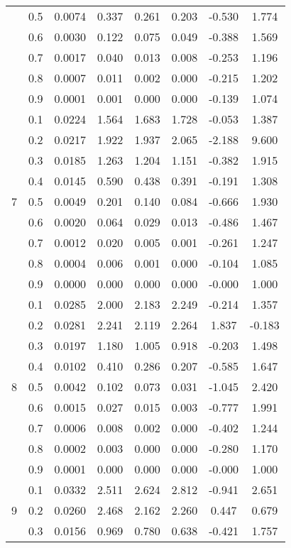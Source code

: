 \documentclass[11pt,a4paper]{report}
\begin{document}
\begin{longtable}{ | c | c || c | c | c | c | c | c | }
 & 0.5 & 0.0074 & 0.337 & 0.261 & 0.203 & -0.530 & 1.774 \\
 & 0.6 & 0.0030 & 0.122 & 0.075 & 0.049 & -0.388 & 1.569 \\
 & 0.7 & 0.0017 & 0.040 & 0.013 & 0.008 & -0.253 & 1.196 \\
 & 0.8 & 0.0007 & 0.011 & 0.002 & 0.000 & -0.215 & 1.202 \\
 & 0.9 & 0.0001 & 0.001 & 0.000 & 0.000 & -0.139 & 1.074 \\
 \hline
\multirow{9}{*}{7} & 0.1 & 0.0224 & 1.564 & 1.683 & 1.728 & -0.053 & 1.387 \\
 & 0.2 & 0.0217 & 1.922 & 1.937 & 2.065 & -2.188 & 9.600 \\
 & 0.3 & 0.0185 & 1.263 & 1.204 & 1.151 & -0.382 & 1.915 \\
 & 0.4 & 0.0145 & 0.590 & 0.438 & 0.391 & -0.191 & 1.308 \\
 & 0.5 & 0.0049 & 0.201 & 0.140 & 0.084 & -0.666 & 1.930 \\
 & 0.6 & 0.0020 & 0.064 & 0.029 & 0.013 & -0.486 & 1.467 \\
 & 0.7 & 0.0012 & 0.020 & 0.005 & 0.001 & -0.261 & 1.247 \\
 & 0.8 & 0.0004 & 0.006 & 0.001 & 0.000 & -0.104 & 1.085 \\
 & 0.9 & 0.0000 & 0.000 & 0.000 & 0.000 & -0.000 & 1.000 \\
 \hline
\multirow{9}{*}{8} & 0.1 & 0.0285 & 2.000 & 2.183 & 2.249 & -0.214 & 1.357 \\
 & 0.2 & 0.0281 & 2.241 & 2.119 & 2.264 & 1.837 & -0.183 \\
 & 0.3 & 0.0197 & 1.180 & 1.005 & 0.918 & -0.203 & 1.498 \\
 & 0.4 & 0.0102 & 0.410 & 0.286 & 0.207 & -0.585 & 1.647 \\
 & 0.5 & 0.0042 & 0.102 & 0.073 & 0.031 & -1.045 & 2.420 \\
 & 0.6 & 0.0015 & 0.027 & 0.015 & 0.003 & -0.777 & 1.991 \\
 & 0.7 & 0.0006 & 0.008 & 0.002 & 0.000 & -0.402 & 1.244 \\
 & 0.8 & 0.0002 & 0.003 & 0.000 & 0.000 & -0.280 & 1.170 \\
 & 0.9 & 0.0001 & 0.000 & 0.000 & 0.000 & -0.000 & 1.000 \\
 \hline
\multirow{9}{*}{9} & 0.1 & 0.0332 & 2.511 & 2.624 & 2.812 & -0.941 & 2.651 \\
 & 0.2 & 0.0260 & 2.468 & 2.162 & 2.260 & 0.447 & 0.679 \\
 & 0.3 & 0.0156 & 0.969 & 0.780 & 0.638 & -0.421 & 1.757 \\

\end{longtable}
\end{document}

